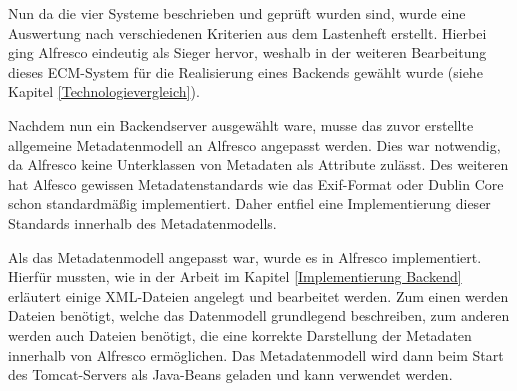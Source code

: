 Nun da die vier Systeme beschrieben und gepr\"uft wurden sind, wurde eine Auswertung nach verschiedenen Kriterien aus dem Lastenheft erstellt. Hierbei ging Alfresco eindeutig als Sieger hervor, weshalb in der weiteren Bearbeitung dieses ECM-System f\"ur die Realisierung eines Backends gew\"ahlt wurde (siehe Kapitel \ref{Technologievergleich}).

Nachdem nun ein Backendserver ausgew\"ahlt ware, musse das zuvor erstellte allgemeine Metadatenmodell an Alfresco angepasst werden. Dies war notwendig, da Alfresco keine Unterklassen von Metadaten als Attribute zul\"asst. Des weiteren hat Alfesco gewissen Metadatenstandards wie das \ac{Exif}-Format oder Dublin Core schon standardm\"a\ss{}ig implementiert. Daher entfiel eine Implementierung dieser Standards innerhalb des Metadatenmodells.

Als das Metadatenmodell angepasst war, wurde es in Alfresco implementiert. Hierf\"ur mussten, wie in der Arbeit im Kapitel \ref{Implementierung Backend} erl\"autert einige XML-Dateien angelegt und bearbeitet werden. Zum einen werden Dateien ben\"otigt, welche das Datenmodell grundlegend beschreiben, zum anderen werden auch Dateien ben\"otigt, die eine korrekte Darstellung der Metadaten innerhalb von Alfresco erm\"oglichen. 
Das Metadatenmodell wird dann beim Start des Tomcat-Servers als Java-Beans geladen und kann verwendet werden.


